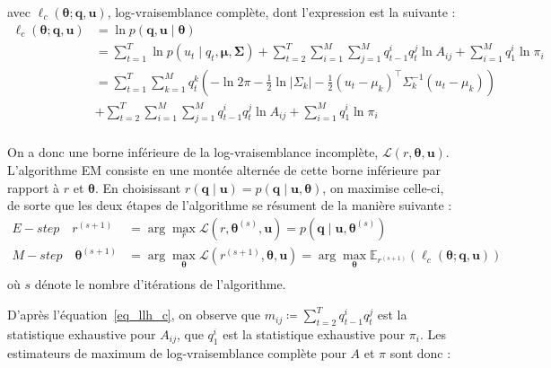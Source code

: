 \documentclass[12pt,a4paper,onecolumn]{article}
\begin{document}
avec \(\ell_c(\bm{\theta} ; \bm{q}, \bm{u})\), log-vraisemblance complète, dont l'expression est la suivante :
\begin{equation}
	\begin{split}
		\ell_c(\bm{\theta} ; \bm{q}, \bm{u}) &= \ln p\left(\bm{q}, \bm{u} \mid \bm{\theta}\right) \\
		&= \sum_{t=1}^{T}\ln p(u_t \mid q_t, \bm{\mu}, \bm{\Sigma}) + \sum_{t=2}^T \sum_{i = 1}^{M} \sum_{j = 1}^{M} q_{t-1}^i q_t^j \ln A_{ij} + \sum_{i = 1}^M q_1^i \ln \pi_i\\
		&= 	\sum_{t=1}^{T}\sum_{k=1}^M q_t^k \left(-\ln2\pi -\frac{1}{2}\ln|\Sigma_k| - \frac{1}{2}(u_t - \mu_k)^{\intercal}\Sigma_k^{-1}(u_t - \mu_k)\right)\\
		&+ \sum_{t=2}^T \sum_{i = 1}^{M} \sum_{j = 1}^{M} q_{t-1}^i q_t^j \ln A_{ij} + \sum_{i = 1}^M q_1^i \ln \pi_i\\
	\end{split}
	\label{eq_llh_c}
\end{equation}

On a donc une borne inférieure de la log-vraisemblance incomplète, \(\mathcal{L}(r, \bm{\theta}, \bm{u})\). L'algorithme EM consiste en une montée alternée de cette borne inférieure par rapport à \(r\) et \(\bm{\theta}\). En choisissant \(r(\bm{q} \mid \bm{u}) = p(\bm{q} \mid \bm{u}, \bm{\theta})\), on maximise celle-ci, de sorte que les deux étapes de l'algorithme se résument de la manière suivante :
\begin{equation}
	\begin{split}
		E-step \quad r^{(s+1)} &= \operatorname{arg}\max_{r} \mathcal{L}(r, \bm{\theta}^{(s)}, \bm{u}) = p(\bm{q} \mid \bm{u}, \bm{\theta}^{(s)})\\
		M-step \quad \bm{\theta}^{(s+1)} &= \operatorname{arg}\max_{\bm{\theta}} \mathcal{L}(r^{(s+1)}, \bm{\theta}, \bm{u}) = \operatorname{arg}\max_{\bm{\theta}} \mathbb{E}_{r^{(s+1)}}(\ell_c(\bm{\theta} ; \bm{q}, \bm{u}))\\
	\end{split}
	\label{eq_EM_steps}
\end{equation}
où \(s\) dénote le nombre d'itérations de l'algorithme.

D'après l'équation~\eqref{eq_llh_c}, on observe que \(m_{ij} \coloneqq \sum_{t=2}^T q_{t-1}^i q_t^j\) est la statistique exhaustive pour \(A_{ij}\), que \(q_1^i\) est la statistique exhaustive pour \(\pi_i\). Les estimateurs de maximum de log-vraisemblance complète pour \(A\) et \(\pi\) sont donc :
\end{document}
